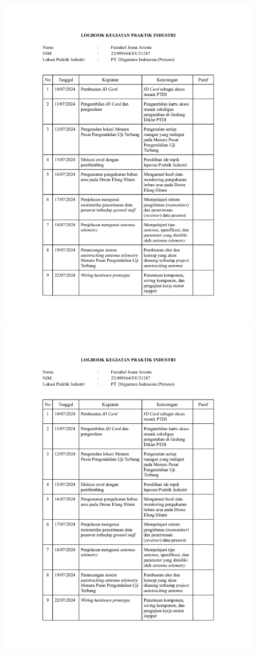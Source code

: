\includegraphics[scale=0.7,page=2]{dokumen/logbook.pdf}
\newpage
\includegraphics[scale=0.7,page=3]{dokumen/logbook.pdf}
